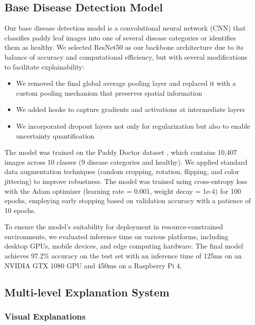 \subsection{Base Disease Detection Model}

Our base disease detection model is a convolutional neural network (CNN) that classifies paddy leaf images into one of several disease categories or identifies them as healthy. We selected ResNet50 \cite{he2016deep} as our backbone architecture due to its balance of accuracy and computational efficiency, but with several modifications to facilitate explainability:

\begin{itemize}
    \item We removed the final global average pooling layer and replaced it with a custom pooling mechanism that preserves spatial information
    \item We added hooks to capture gradients and activations at intermediate layers
    \item We incorporated dropout layers not only for regularization but also to enable uncertainty quantification
\end{itemize}

The model was trained on the Paddy Doctor dataset \cite{das2020paddy}, which contains 10,407 images across 10 classes (9 disease categories and healthy). We applied standard data augmentation techniques (random cropping, rotation, flipping, and color jittering) to improve robustness. The model was trained using cross-entropy loss with the Adam optimizer (learning rate = 0.001, weight decay = 1e-4) for 100 epochs, employing early stopping based on validation accuracy with a patience of 10 epochs.

To ensure the model's suitability for deployment in resource-constrained environments, we evaluated inference time on various platforms, including desktop GPUs, mobile devices, and edge computing hardware. The final model achieves 97.2\% accuracy on the test set with an inference time of 125ms on an NVIDIA GTX 1080 GPU and 450ms on a Raspberry Pi 4.

\subsection{Multi-level Explanation System}

\subsubsection{Visual Explanations}

